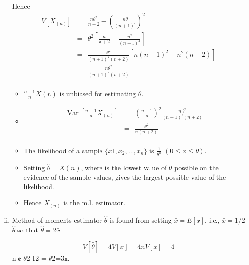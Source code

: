 \documentclass[a4paper,12pt]{article}
\begin{document}
\begin{enumerate}[(i)]
\begin{itemize}
\end{itemize}
Hence
\begin{eqnarray*}
V \left[X_{(n)}\right] 
&=& \frac{n\theta^2}{n+2} - \left( \frac{n\theta}{(n+1)^2} \right)^2\\ 
&=& \theta^2 \left[ \frac{n}{n+2} -  \frac{n^2}{(n+1)^2 }\right]\\
&=& \frac{\theta^2}{(n+1)^2(n+2)} \left[n(n + 1)^2 - n^2(n + 2)\right] \\ 
&=& \frac{n \theta^2}{(n+1)^2(n+2)}\\
\end{eqnarray*}

\begin{itemize}
\item $\displaystyle{ \frac{n+1}{n}X(n) }$ is unbiased for estimating $\theta$.
\item

\begin{eqnarray*}
\operatorname{Var} [\frac{n+1}{n} X_{(n)}]  &=&
\left(\frac{n+1}{n}\right)^2  \frac{n\;\theta^2}{(n+1)^2(n+2)} \\
&=& \frac{\theta^2}{n(n+2)}\\
\end{eqnarray*}

\item The likelihood of a sample $\{x1,x_2,\ldots, x_n\}$ is $\frac{1}{\theta^n}$
$(0 \leq x \leq \theta)$.
\item Setting $\hat{\theta} = X(n)$, where is the lowest value of $\theta$ possible on the evidence of
the sample values, gives the largest possible value of the likelihood.
\item  Hence $X_{(n)}$ is the m.l. estimator.
\end{itemize}
\item Method of moments estimator $\hat{\theta}$ is found from setting $\bar{x} = E[x]$, i.e., $\bar{x} = 1/2$
$\hat{\theta}$
so that $\hat{\theta} = 2\bar{x}$. 

\[V [\hat{\theta}] = 4V [\bar{x}] = 4
nV [x] = 4\]
n ¢ $\theta$2
12 = $\theta$2=3n.


\end{enumerate}
\end{document}
